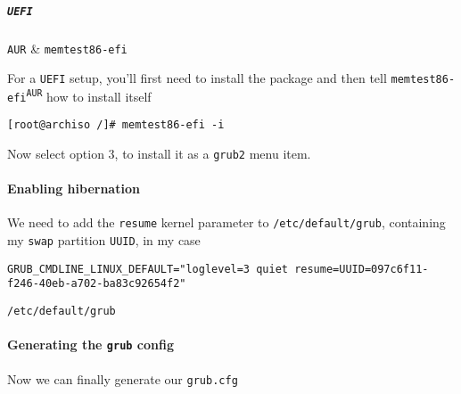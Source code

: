 \documentclass[10pt]{dustdoc}
\begin{document}
\subparagraph{\texttt{UEFI}}
\label{par:installing-memtest-uefi}

\begin{packagetable}
    \texttt{AUR} & \texttt{memtest86-efi} \\
\end{packagetable}

For a \texttt{UEFI} setup, you’ll first need to install the package and then tell \texttt{memtest86-efi\textsuperscript{\texttt{AUR}}} how to install itself

\begin{verbatim}
[root@archiso /]# memtest86-efi -i
\end{verbatim}

Now select option 3, to install it as a \texttt{grub2} menu item.

\paragraph{Enabling hibernation}
\label{par:enabling-hibernation}

We need to add the \texttt{resume} kernel parameter to \texttt{/etc/default/grub}, containing my \texttt{swap} partition \texttt{UUID}, in my case

\begin{mintedlisting}
    \begin{verbatim}
GRUB_CMDLINE_LINUX_DEFAULT="loglevel=3 quiet resume=UUID=097c6f11-f246-40eb-a702-ba83c92654f2"
    \end{verbatim}

    \caption{\texttt{/etc/default/grub}}
\end{mintedlisting}


\paragraph{Generating the \texttt{grub} config}
\label{par:generating-the-grub-config}

Now we can finally generate our \texttt{grub.cfg}
\end{document}
